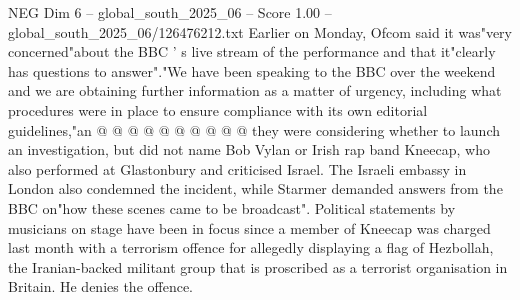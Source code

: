 \begin{textsample}{NEG Dim 6 – global\_south\_2025\_06 – Score 1.00 – global\_south\_2025\_06/126476212.txt}
Earlier on Monday, Ofcom said it was"very concerned"about the BBC ' s live stream of the performance and that it"clearly has questions to answer"."We have been speaking to the BBC over the weekend and we are obtaining further information as a matter of urgency, including what procedures were in place to ensure compliance with its own editorial guidelines,"an @ @ @ @ @ @ @ @ @ @ they were considering whether to launch an investigation, but did not name Bob Vylan or Irish rap band Kneecap, who also performed at Glastonbury and criticised Israel.
The Israeli embassy in London also condemned the incident, while Starmer demanded answers from the BBC on"how these scenes came to be broadcast".
Political statements by musicians on stage have been in focus since a member of Kneecap was charged last month with a terrorism offence for allegedly displaying a flag of Hezbollah, the Iranian-backed militant group that is proscribed as a terrorist organisation in Britain.
He denies the offence.

\end{textsample}
